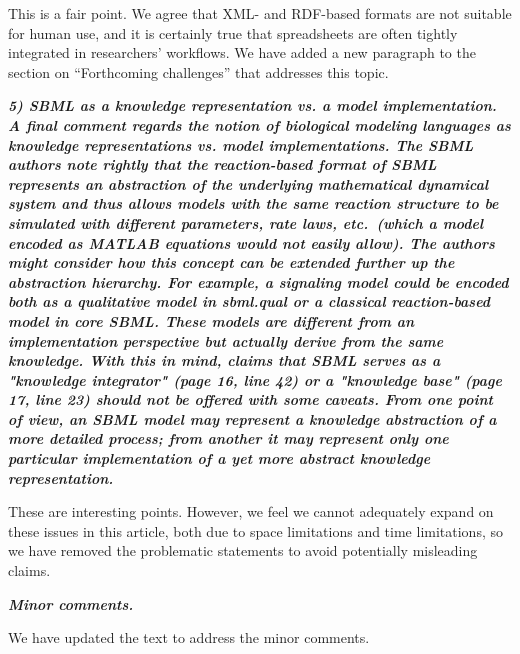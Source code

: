 \documentclass[11pt]{mhletter}
\begin{document}
This is a fair point.  We agree that XML- and RDF-based formats are not suitable for human use, and it is certainly true that spreadsheets are often tightly integrated in researchers' workflows.  We have added a new paragraph to the section on ``Forthcoming challenges'' that addresses this topic.


\textbf{\textit{5) SBML as a knowledge representation vs. a model implementation.  A final comment regards the notion of biological modeling languages as knowledge representations vs. model implementations. The SBML authors note rightly that the reaction-based format of SBML represents an abstraction of the underlying mathematical dynamical system and thus allows models with the same reaction structure to be simulated with different parameters, rate laws, etc.\ (which a model encoded as MATLAB equations would not easily allow). The authors might consider how this concept can be extended further up the abstraction hierarchy. For example, a signaling model could be encoded both as a qualitative model in sbml.qual or a classical reaction-based model in core SBML. These models are different from an implementation perspective but actually derive from the same knowledge. With this in mind, claims that SBML serves as a "knowledge integrator" (page 16, line 42) or a "knowledge base" (page 17, line 23) should not be offered with some caveats. From one point of view, an SBML model may represent a knowledge abstraction of a more detailed process; from another it may represent only one particular implementation of a yet more abstract knowledge representation.}}

These are interesting points.  However, we feel we cannot adequately expand on these issues in this article, both due to space limitations and time limitations, so we have removed the problematic statements to avoid potentially misleading claims.


\textbf{\textit{Minor comments.}}

We have updated the text to address the minor comments.
\end{document}
